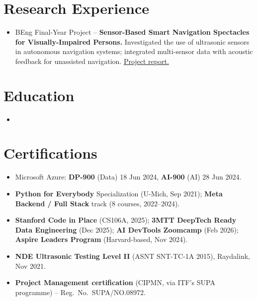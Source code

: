 \documentclass[11pt,a4paper,sans]{moderncv}
\begin{document}

\section{Research Experience}
\vspace{1pt}
\begin{itemize}
\item{BEng Final-Year Project -- \textbf{Sensor-Based Smart Navigation Spectacles for Visually-Impaired Persons.} Investigated the use of ultrasonic sensors in autonomous navigation systems; integrated multi-sensor data with acoustic feedback for unassisted navigation. \href{https://drive.google.com/file/d/1fHH3ur6j6rsPVoCuQM8V16OAbUz7mh2/view?usp=sharing}{Project report.}}
\end{itemize}


\section{Education}
\vspace{1pt}
\begin{itemize}
\item{}
\end{itemize}


\section{Certifications}
\vspace{1pt}
\begin{itemize}
\item Microsoft Azure: \textbf{DP-900} (Data) 18 Jun 2024, \textbf{AI-900} (AI) 28 Jun 2024.
\item \textbf{Python for Everybody} Specialization (U-Mich, Sep 2021); \textbf{Meta Backend / Full Stack} track (8 courses, 2022--2024).
\item \textbf{Stanford Code in Place} (CS106A, 2025); \textbf{3MTT DeepTech Ready Data Engineering} (Dec 2025); \textbf{AI DevTools Zoomcamp} (Feb 2026); \textbf{Aspire Leaders Program} (Harvard-based, Nov 2024).
\item \textbf{NDE Ultrasonic Testing Level II} (ASNT SNT-TC-1A 2015), Raydalink, Nov 2021.
\item \textbf{Project Management certification} (CIPMN, via ITF's SUPA programme) -- Reg.\ No.\ SUPA/NO.08972.
\end{itemize}
\end{document}
